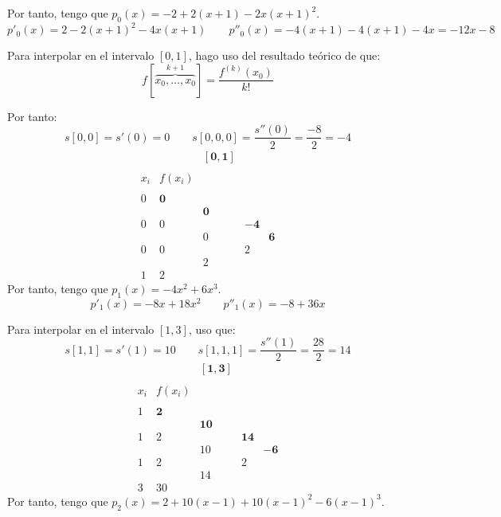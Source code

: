 \begin{ejercicio}
    Por tanto, tengo que $p_0(x)=-2+2(x+1)-2x(x+1)^2$.
    \begin{equation*}
        p'_0(x)=2-2(x+1)^2-4x(x+1)
        \qquad
        p''_0(x)=-4(x+1)-4(x+1)-4x = -12x-8
    \end{equation*}

    Para interpolar en el intervalo $[0,1]$, hago uso del resultado teórico de que:
    \begin{equation*}
        f[\overbrace{x_0,\dots,x_0}^{k+1}] = \frac{f^{(k)}(x_0)}{k!}
    \end{equation*}
    
    Por tanto:
    \begin{equation*}
        s[0,0]=s'(0)=0
        \qquad
        s[0,0,0]=\frac{s''(0)}{2}=\frac{-8}{2}=-4
    \end{equation*}
    \begin{equation*}
        \begin{array}{c|cccc}
            &&\mathbf{[0,1]} \\ \\
            x_i & f(x_i) \\ \\
            0 & \mathbf{0} \\
            && \mathbf{0}\\
            0 & 0 && \mathbf{-4}\\
            && 0 && \mathbf{6}\\ 
            0 & 0 && 2\\
            && 2\\
            1 & 2
        \end{array}
    \end{equation*}
    Por tanto, tengo que $p_1(x)=-4x^2+6x^3$.
    \begin{equation*}
        p'_1(x)=-8x+18x^2
        \qquad
        p''_1(x)=-8+36x
    \end{equation*}

    Para interpolar en el intervalo $[1,3]$, uso que:
    \begin{equation*}
        s[1,1]=s'(1)=10
        \qquad
        s[1,1,1]=\frac{s''(1)}{2}=\frac{28}{2}=14
    \end{equation*}
    \begin{equation*}
        \begin{array}{c|cccc}
            &&\mathbf{[1,3]} \\ \\
            x_i & f(x_i) \\ \\
            1 & \mathbf{2} \\
            && \mathbf{10}\\
            1 & 2 && \mathbf{14}\\
            && 10 && \mathbf{-6}\\ 
            1 & 2 && 2\\
            && 14\\
            3 & 30
        \end{array}
    \end{equation*}
    Por tanto, tengo que $p_2(x)=2+10(x-1)+10(x-1)^2-6(x-1)^3$.



\end{ejercicio}
